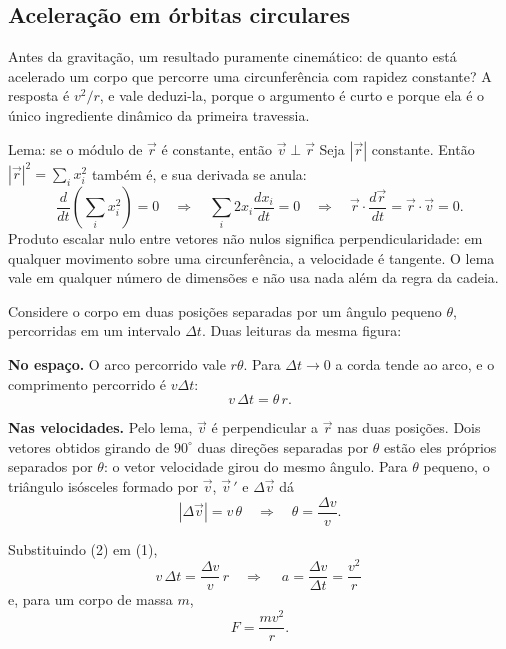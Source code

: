 \documentclass[11pt,a4paper]{article}
\begin{document}
\subsection*{Aceleração em órbitas circulares}

Antes da gravitação, um resultado puramente cinemático: de quanto está acelerado um corpo que percorre uma
circunferência com rapidez constante? A resposta é $v^{2}/r$, e vale deduzi-la, porque o argumento é curto e
porque ela é o único ingrediente dinâmico da primeira travessia.

\begin{lessonblock}[borderline west={2pt}{0pt}{astroGold}]{Lema: se o módulo de $\vec{r}$ é constante, então $\vec{v}\perp\vec{r}$}
Seja $|\vec{r}|$ constante. Então $|\vec{r}|^{2}=\sum_i x_i^{2}$ também é, e sua derivada se anula:
\[
\frac{d}{dt}\left(\sum_i x_i^{2}\right)=0
\quad\Longrightarrow\quad
\sum_i 2x_i\frac{dx_i}{dt}=0
\quad\Longrightarrow\quad
\vec{r}\cdot\frac{d\vec{r}}{dt}=\vec{r}\cdot\vec{v}=0.
\]
Produto escalar nulo entre vetores não nulos significa perpendicularidade: em qualquer movimento sobre uma
circunferência, a velocidade é tangente. O lema vale em qualquer número de dimensões e não usa nada além da
regra da cadeia.
\end{lessonblock}

Considere o corpo em duas posições separadas por um ângulo pequeno $\theta$, percorridas em um intervalo
$\Delta t$. Duas leituras da mesma figura:

\textbf{No espaço.} O arco percorrido vale $r\theta$. Para $\Delta t\to0$ a corda tende ao arco, e o
comprimento percorrido é $v\Delta t$:
\begin{equation}
v\,\Delta t=\theta\,r.
\tag{1}
\end{equation}

\textbf{Nas velocidades.} Pelo lema, $\vec{v}$ é perpendicular a $\vec{r}$ nas duas posições. Dois vetores
obtidos girando de $90^\circ$ duas direções separadas por $\theta$ estão eles próprios separados por $\theta$:
o vetor velocidade girou do mesmo ângulo. Para $\theta$ pequeno, o triângulo isósceles formado por $\vec{v}$,
$\vec{v}\,'$ e $\Delta\vec{v}$ dá
\begin{equation}
|\Delta\vec{v}|=v\,\theta
\quad\Longrightarrow\quad
\theta=\frac{\Delta v}{v}.
\tag{2}
\end{equation}

Substituindo (2) em (1),
\[
v\,\Delta t=\frac{\Delta v}{v}\,r
\quad\Longrightarrow\quad
\boxed{\ a=\frac{\Delta v}{\Delta t}=\frac{v^{2}}{r}\ }
\]
e, para um corpo de massa $m$,
\[
F=\frac{mv^{2}}{r}.
\]
\end{document}
